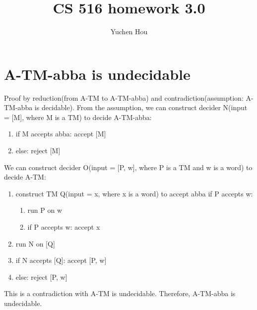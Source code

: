 \documentclass{article}
\begin{document}
\lstset{language=python, tabsize=4}
\title{CS 516 homework 3.0}
\author{Yuchen Hou}
\maketitle

\section{A-TM-abba is undecidable}
Proof by reduction(from A-TM to A-TM-abba) and contradiction(assumption: A-TM-abba is decidable). From the assumption, we can construct decider N(input = [M], where M is a TM) to decide A-TM-abba:
\begin{enumerate}
	\item if M accepts abba: accept [M]
	\item else: reject [M]
\end{enumerate}
We can construct decider O(input = [P, w], where P is a TM and w is a word) to decide A-TM:
\begin{enumerate}
	\item construct TM Q(input = x, where x is a word) to accept abba if P 
	accepts w:
	\begin{enumerate}
		\item run P on w
		\item if P accepts w: accept x
	\end{enumerate}
	\item run N on [Q]
	\item if N accepts [Q]: accept [P, w]
	\item else: reject [P, w]
\end{enumerate}
This is a contradiction with A-TM is undecidable. Therefore, A-TM-abba is undecidable.
\end{document}
